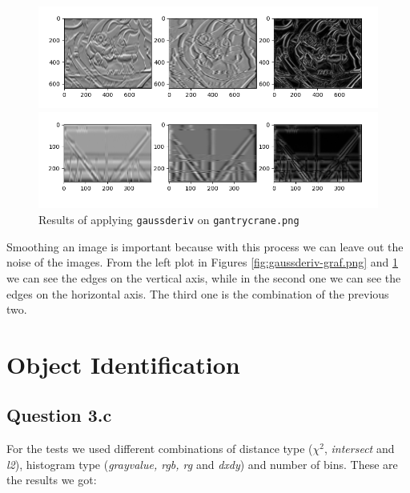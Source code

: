 \documentclass{article}
\begin{document}
\begin{figure}[ht]
    \centering
    \includegraphics[width=\textwidth]{images/Q1.e-graf-gaussderived.png}
    \cprotect\caption{Results of applying \verb|gaussderiv| on \verb|graf.png|}
    \label{fig:gaussderiv-graf.png}
    
    \includegraphics[width=\textwidth]{images/Q1.e-gantrycrane-gaussderived.png}
    \cprotect\caption{Results of applying \verb|gaussderiv| on \verb|gantrycrane.png|}
    \label{fig:gaussderiv-gantrycrane.png}
\end{figure}

\noindent
Smoothing an image is important because with this process we can leave out the noise of the images.
\newline
\newline
From the left plot in Figures \ref{fig:gaussderiv-graf.png} and \ref{fig:gaussderiv-gantrycrane.png} we can see the edges on the vertical axis, while in the second one we can see the edges on the horizontal axis. The third one is the combination of the previous two.

\newpage
\section{Object Identification}

\subsection{Question 3.c}
For the tests we used different combinations of distance type ($\chi^2$, \textit{intersect} and \textit{l2}), histogram type (\textit{grayvalue, rgb, rg} and \textit{dxdy}) and number of bins.
\newline
\newline
These are the results we got:
\end{document}

